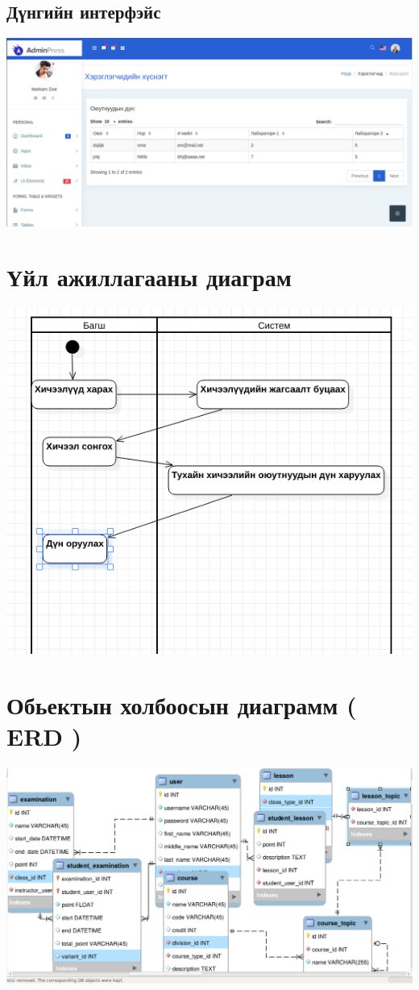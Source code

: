 \documentclass[
oneside, %
english, %
onehalfspacing, %
nolistspacing, %
headsepline, %
]{article} %
\begin{document}
     \subsection{Дүнгийн интерфэйс}
     \includegraphics[width=\textwidth]{dvn}
     	
     	\section{Үйл ажиллагааны диаграм}
     	\includegraphics[width=\textwidth]{dvnoruul}
     	
     \section{Обьектын холбоосын диаграмм ( ERD )}
     \includegraphics[width=\textwidth]{erd}
\end{document}

